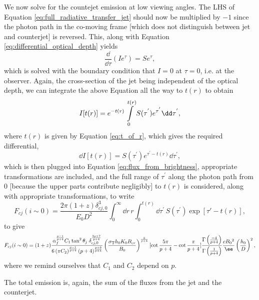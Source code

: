 We now solve for the countejet emission at low viewing angles. The LHS of Equation \ref{eq:full_radiative_transfer_jet} should now be multiplied by $-1$ since the photon path in the co-moving frame [which does not distinguish between jet and counterjet] is reversed. This, along with Equation \ref{eq:differential_optical_depth} yields
\begin{equation}
\dfrac{\dd}{\dd \tau}(I e^{\tau}) = S e^{\tau},
\label{eq:radiative_transfer_equation_for_counterjet}
\end{equation}
which is solved with the boundary condition that $I = 0$ at $\tau = 0$, i.e. at the observer. Again, the cross-section of the jet being independent of the optical depth, we can integrate the above Equation all the way to $t(r)$ to obtain
\begin{equation}
I[t(r)] = e^{-t(r)} \intop_{0}^{t(r)} S(\tau^{'}) e^{\tau^{'}} \dd \tau^{'},
\label{eq:brightness_profile_of_counterjet}
\end{equation}
where $t(r)$ is given by Equation \ref{eq:t_of_r}, which gives the required differential,
\begin{equation}
\dd I[t(r)] = S(\tau^{'}) e^{\tau^{'} - t(r)} \dd \tau^{'},
\end{equation}
which is then plugged into Equation  \ref{eq:flux_from_brightness}, appropriate transformations are included, and the full range of $ \tau^{'} $ along the photon path from $0$ [because the upper parts contribute negligibly] to $t(r)$ is considered, along with appropriate transformations, to write
\begin{equation}
F_{cj} (i \sim 0) = \dfrac{2 \pi (1+z) \delta_{cj,0}^3}{E_0 D^2} \int_{0}^{\infty} \dd r \, r \int_{0}^{t(r)} \dd \tau^{'} \, S(\tau^{'}) \exp[\tau'-t(r)],
\label{eq:counterjet_flux_integral}
\end{equation}
to give
\begin{equation}
F_{cj} (i \sim 0) = (1+z) \dfrac{ \alpha_f^{\frac{p-1}{p+4} } C_1 \tan ^2 \theta_j \; \delta_{cj,0}^{\frac{3p+7}{p+4}} }{ 6 \left(\pi C_2 \right)^{\frac{p-1}{p+4}} (p+4)^{\frac{p+9}{p+4}} }\left(\dfrac{ \sigma_{\rm{T}} h_0 K_0 B_{cr}}{B_0}\right)^{\frac{5}{p+4}} [ \cot\frac{5\pi}{p+4} - \cot\frac{\pi}{p+4} ] \dfrac{\Gamma\left(\frac{-4}{p+4}\right)}{\Gamma\left(\frac{1}{p+4}\right)} \frac{ c B_0{^2} }{\ee} \left(\frac{h_0}{D}\right)^2,
\label{eq:Flux_counterjet_on_axis}
\end{equation}
where we remind ourselves that $C_1$ and $C_2$ depend on $p$.

The total emission is, again, the sum of the fluxes from the jet and the counterjet.

